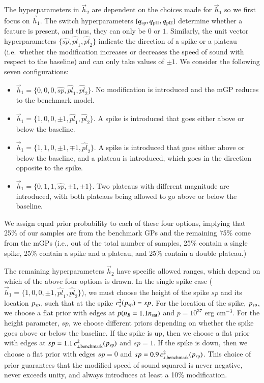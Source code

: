 \documentclass[aps,prd,nofootinbib,tightenlines,notitlepage,floatfix,superscriptaddress,showkeys,twocolumn]{revtex4-1}
\begin{document}
The hyperparameters in $\vec{h}_2$ are dependent on the choices made for $\vec{h}_1$ so we first focus on $\vec{h}_1$.
The switch hyperparameters $\{q_{\rm sp}, q_{\rm pl1}, q_{\rm pl2}\}$  determine whether a feature is present, and thus, they can only be $0$ or $1$. Similarly, the unit vector hyperparameters $\{\widehat{sp}, \widehat{pl}_1,\widehat{pl}_2\}$ indicate the direction of a spike or a plateau (i.e.~whether the modification increases or decreases the speed of sound with respect to the baseline) and can only take values of $\pm 1$. We consider the following seven configurations:
\begin{itemize}
\item $\vec{h}_1 = \{0,0,0,\widehat{sp},\widehat{pl}_1,\widehat{pl}_2\}$. No modification is introduced and the mGP reduces to the benchmark model.
%
\item $\vec{h}_1 = \{1,0,0,\pm 1,\widehat{pl}_1,\widehat{pl}_2\}$. A spike is introduced that goes either above or below the baseline. 
%
\item $\vec{h}_1 = \{1,1,0,\pm 1,\mp 1,\widehat{pl}_2\}$. A spike is introduced that goes either above or below the baseline, and a plateau is introduced, which goes in the direction opposite to the spike. 
%
\item $\vec{h}_1 = \{0,1,1,\widehat{sp},\pm 1, \pm 1\}$. Two plateaus with different magnitude are introduced, with both plateaus being allowed to go above or below the baseline. 
\end{itemize}
We assign equal prior probability to each of these four options, implying that 25\% of our samples are from the benchmark GPs and the remaining 75\% come from the mGPs (i.e., out of the total number of samples, 25\% contain a single spike, 25\% contain a spike and a plateau, and 25\% contain a double plateau.) 

The remaining hyperparameters $\vec{h}_2$ have specific allowed ranges, which depend on which of the above four options is drawn. In the single spike case ($\vec{h}_1 = \{1,0,0,\pm 1,\widehat{pl}_1,\widehat{pl}_2\}$), we must choose the height of the spike $sp$ and its location $p_{\rm sp}$, such that at the spike $c_s^2(p_{\rm sp}) = sp$. For the location of the spike, $p_{\rm sp}$, we choose a flat prior with edges at $p(n_B = 1.1 n_{\rm sat})$ and $p = 10^{37}$ erg cm$^{-3}$. For the height parameter, $sp$, we choose different priors depending on whether the spike goes above or below the baseline. If the spike is up, then we choose a flat prior with edges at $sp= 1.1 \, c_{s,\rm benchmark}^2(p_{\rm sp})$ and $sp=1$. If the spike is down, then we choose a flat prior with edges $sp=0$ and $sp= 0.9 \, c_{s,\rm benchmark}^2(p_{\rm sp})$. This choice of prior guarantees that the modified speed of sound squared is never negative, never exceeds unity, and always introduces at least a 10\% modification. 
\end{document}
